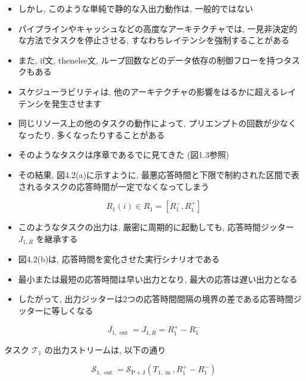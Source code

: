 \begin{frame}{}
    \begin{itemize}
        \item しかし, このような単純で静的な入出力動作は, 一般的ではない
        \item パイプラインやキャッシュなどの高度なアーキテクチャでは, 一見非決定的な方法でタスクを停止させる, すなわちレイテンシを強制することがある
        \item また, if文, thenelse文, ループ回数などのデータ依存の制御フローを持つタスクもある
        \item スケジューラビリティは, 他のアーキテクチャの影響をはるかに超えるレイテンシを発生させます
        \item 同じリソース上の他のタスクの動作によって, プリエンプトの回数が少なくなったり, 多くなったりすることがある
        \item そのようなタスクは序章であるでに見てきた (図1.3参照)
        \item その結果, 図4.2(a)に示すように, 最悪応答時間と下限で制約された区間で表されるタスクの応答時間が一定でなくなってしまう

    \end{itemize}
    \begin{equation*}
        R_{1}(i) \in R_{1}=\left[R_{1}^{-} ,  R_{1}^{+}\right]
    \end{equation*}
\end{frame}

\begin{frame}{}
    \begin{itemize}
        \item このようなタスクの出力は, 厳密に周期的に起動しても, 応答時間ジッター $J_{1, R}$ を継承する
        \item 図4.2(b)は, 応答時間を変化させた実行シナリオである
        \item 最小または最短の応答時間は早い出力となり, 最大の応答は遅い出力となる
        \item したがって, 出力ジッターは2つの応答時間間隔の境界の差である応答時間ジッターに等しくなる

    \end{itemize}
    \begin{equation*}
        J_{1, \text { out }}=J_{1, R}=R_{1}^{+}-R_{1}^{-}
    \end{equation*}
\end{frame}

\begin{frame}{}
    タスク $\mathcal{T}_{1}$ の出力ストリームは, 以下の通り

    \begin{equation*}
        \mathcal{S}_{1, \text { out }}=\mathcal{S}_{\mathrm{P}+\mathrm{J}}\left(T_{1, \text { in }}, R_{1}^{+}-R_{1}^{-}\right)
    \end{equation*}
\end{frame}

